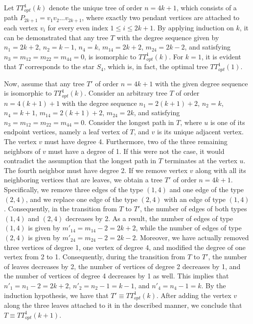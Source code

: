 \documentclass[preprint,12pt]{elsarticle}
\begin{document}
\smallskip

Let $TT^1_{opt}(k)$ denote the unique tree of order $n = 4k + 1$, which consists of a path $P_{2k+1} = v_1 v_2 \ldots v_{2k+1}$, where exactly two pendant vertices are attached to each vertex $v_i$ for every even index $1 \leq i \leq 2k+1$. By applying induction on $k$, it can be demonstrated that any tree $T$ with the degree sequence given by $n_1=2k+2$, $n_2=k-1$, $n_4=k$, $m_{14}=2k+2$, $m_{24}=2k-2$, and satisfying $n_3=m_{12}=m_{22}=m_{44}=0$, is isomorphic to $TT^1_{opt}(k)$. For $k=1$, it is evident that $T$ corresponds to the star $S_4$, which is, in fact, the optimal tree $TT^1_{opt}(1)$.

Now, assume that any tree $T'$ of order $n = 4k + 1$ with the given degree sequence is isomorphic to $TT^1_{opt}(k)$. Consider an arbitrary tree $T$ of order $n = 4(k+1) + 1$ with the degree sequence $n_1=2(k+1)+2$, $n_2=k$, $n_4=k+1$, $m_{14}=2(k+1)+2$, $m_{24}=2k$, and satisfying $n_3=m_{12}=m_{22}=m_{44}=0$.
Consider the longest path in $T$, where $u$ is one of its endpoint vertices, namely a leaf vertex of $T$, and $v$ is its unique adjacent vertex. The vertex $v$ must have degree 4.
Furthermore,  two of the three remaining neighbors of $v$ must have a degree of 1. If this were not the case, it would contradict the assumption that the longest path in $T$ terminates at the vertex $u$. The fourth neighbor must have degree 2. 
If we remove vertex $v$ along with all its neighboring vertices that are leaves, we obtain a tree $T'$ of order $n = 4k + 1$. Specifically, we remove three edges of the type $(1,4)$ and one edge of the type $(2,4)$, and we replace one edge of the type $(2,4)$ with an edge of type $(1,4)$.  Consequently, in the transition from $T$ to $T'$, the number of edges of both types $(1,4)$ and $(2,4)$ decreases by 2.
 As a result, the number of edges of type $(1,4)$ is given by $m'_{14} = m_{14} - 2 = 2k + 2$, while the number of edges of type $(2,4)$ is given by $m'_{24} = m_{24} - 2 = 2k - 2$. Moreover, we have actually removed three vertices of degree 1, one vertex of degree 4, and modified the degree of one vertex from 2 to 1. Consequently, during the transition from $T$ to $T'$, the number of leaves decreases by 2, the number of vertices of degree 2 decreases by 1, and the number of vertices of degree 4 decreases by 1 as well. This implies that $n'_1 = n_1 - 2 = 2k + 2$, $n'_2 = n_2 - 1 = k - 1$, and $n'_4 = n_4 - 1 = k$.
By the induction hypothesis, we have that $T' \equiv TT^1_{opt}(k)$. After adding the vertex $v$ along the three leaves attached to it in the described manner, we conclude that $T\equiv TT^1_{opt}(k+1)$.
\end{document}
